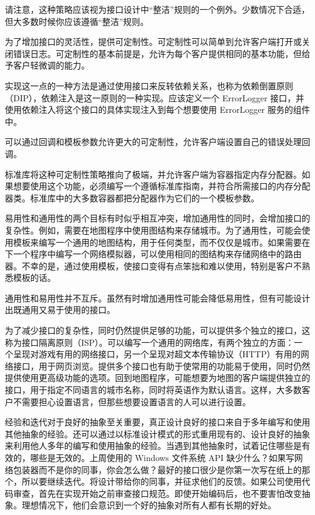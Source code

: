 请注意，这种策略应该视为接口设计中“整洁”规则的一个例外。少数情况下合适，但大多数时候你应该遵循“整洁”规则。


为了增加接口的灵活性，提供可定制性。可定制性可以简单到允许客户端打开或关闭错误日志。可定制性的基本前提是，允许为每个客户提供相同的基本功能，但给予客户轻微调的能力。

实现这一点的一种方法是通过使用接口来反转依赖关系，也称为依赖倒置原则（DIP），依赖注入是这一原则的一种实现。应该定义一个 ErrorLogger 接口，并使用依赖注入将这个接口的具体实现注入到每个想要使用 ErrorLogger 服务的组件中。

可以通过回调和模板参数允许更大的可定制性，允许客户端设置自己的错误处理回调。

标准库将这种可定制性策略推向了极端，并允许客户端为容器指定内存分配器。如果想要使用这个功能，必须编写一个遵循标准库指南，并符合所需接口的内存分配器类。标准库中的大多数容器都把分配器作为它们的一个模板参数。


易用性和通用性的两个目标有时似乎相互冲突，增加通用性的同时，会增加接口的复杂性。例如，需要在地图程序中使用图结构来存储城市。为了通用性，可能会使用模板来编写一个通用的地图结构，用于任何类型，而不仅仅是城市。如果需要在下一个程序中编写一个网络模拟器，可以使用相同的图结构来存储网络中的路由器。不幸的是，通过使用模板，使接口变得有点笨拙和难以使用，特别是客户不熟悉模板的话。

通用性和易用性并不互斥。虽然有时增加通用性可能会降低易用性，但有可能设计出既通用又易于使用的接口。

为了减少接口的复杂性，同时仍然提供足够的功能，可以提供多个独立的接口，这称为接口隔离原则（ISP）。可以编写一个通用的网络库，有两个独立的方面：一个呈现对游戏有用的网络接口，另一个呈现对超文本传输协议（HTTP）有用的网络接口，用于网页浏览。提供多个接口也有助于使常用的功能易于使用，同时仍然提供使用更高级功能的选项。回到地图程序，可能想要为地图的客户端提供独立的接口，用于指定不同语言的城市名称，同时将英语作为默认语言。这样，大多数客户不需要担心设置语言，但那些想要设置语言的人可以进行设置。


经验和迭代对于良好的抽象至关重要，真正设计良好的接口来自于多年编写和使用其他抽象的经验。还可以通过以标准设计模式的形式重用现有的、设计良好的抽象来利用他人多年的编写和使用抽象的经验。当遇到其他抽象时，试着记住哪些是有效的，哪些是无效的。上周使用的 Windows 文件系统 API 缺少什么？如果写网络包装器而不是你的同事，你会怎么做？最好的接口很少是你第一次写在纸上的那个，所以要继续迭代。将设计带给你的同事，并征求他们的反馈。如果公司使用代码审查，首先在实现开始之前审查接口规范。即使开始编码后，也不要害怕改变抽象。理想情况下，他们会意识到一个好的抽象对所有人都有长期的好处。

